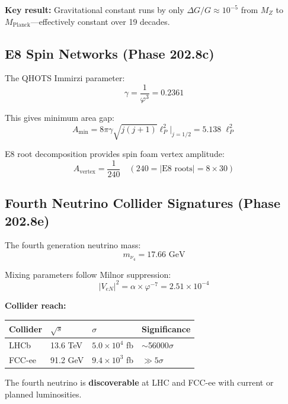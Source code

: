 \documentclass[aps,prd,twocolumn,superscriptaddress,floatfix,nofootinbib]{revtex4-2}
\theoremstyle{definition}
\theoremstyle{remark}
\newcommand{\vp}{\varphi}
\begin{document}
\textbf{Key result:} Gravitational constant runs by only $\Delta G/G \approx 10^{-5}$ from $M_Z$ to $M_{\text{Planck}}$---effectively constant over 19 decades.

\subsection{E8 Spin Networks (Phase 202.8c)}

The QHOTS Immirzi parameter:
\begin{equation}
\gamma = \frac{1}{\vp^3} = 0.2361
\end{equation}

This gives minimum area gap:
\begin{equation}
A_{\min} = 8\pi\gamma \sqrt{j(j+1)} \ell_P^2 \big|_{j=1/2} = 5.138\; \ell_P^2
\end{equation}

E8 root decomposition provides spin foam vertex amplitude:
\begin{equation}
A_{\text{vertex}} = \frac{1}{240} \quad (240 = |\text{E8 roots}| = 8 \times 30)
\end{equation}

\subsection{Fourth Neutrino Collider Signatures (Phase 202.8e)}

The fourth generation neutrino mass:
\begin{equation}
m_{\nu_4} = 17.66\text{ GeV}
\end{equation}

Mixing parameters follow Milnor suppression:
\begin{equation}
|V_{eN}|^2 = \alpha \times \vp^{-7} = 2.51 \times 10^{-4}
\end{equation}

\textbf{Collider reach:}
\begin{center}
\small
\begin{tabular}{llll}
\toprule
Collider & $\sqrt{s}$ & $\sigma$ & Significance \\
\midrule
LHCb & 13.6 TeV & $5.0\times10^4$ fb & $\sim$56000$\sigma$ \\
FCC-ee & 91.2 GeV & $9.4\times10^3$ fb & $\gg 5\sigma$ \\
\bottomrule
\end{tabular}
\end{center}

The fourth neutrino is \textbf{discoverable} at LHC and FCC-ee with current or planned luminosities.
\end{document}
